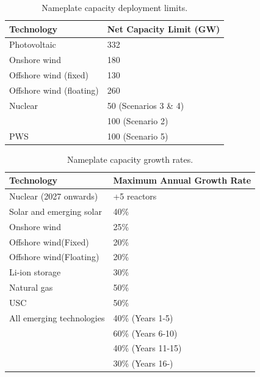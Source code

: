 


\begin{table}[H]
	\caption{Nameplate capacity deployment limits.}
	\vspace{0.1in}
	\begin{tabularx}{\textwidth}{p{} p{} }
		\hline
\textbf{Technology} & \textbf{Net Capacity} \textbf{Limit} (GW)\\
\hline
Photovoltaic \cite{isep_53_2018} & 332 \\
Onshore wind \cite{heger_wind_2016,kato_energy_2016} & 180 \\
Offshore wind (fixed) \cite{heger_wind_2016,kato_energy_2016}& 130 \\
Offshore wind (floating) \cite{heger_wind_2016,kato_energy_2016}& 260 \\
Nuclear & 50 (Scenarios 3 \& 4) \\
 & 100 (Scenario 2) \\
\gls{PWS} \cite{pinaud_technical_2013} & 100 (Scenario 5) \\
\hline 
\end{tabularx}
\label{caplim}
\end{table}

\begin{table}[H]
	\caption{Nameplate capacity growth rates.}
	\vspace{0.1in}
	\begin{tabularx}{\textwidth}{p{} p{}}
		\hline
\textbf{Technology} & \textbf{Maximum Annual Growth Rate} \\
\hline
Nuclear (2027 onwards) & +5 reactors \\
Solar and emerging solar \cite{irena_renewable_2020} & 40\%  \\
Onshore wind \cite{irena_renewable_2020} & 25\% \\
Offshore wind(Fixed) \cite{irena_renewable_2020} & 20\% \\
Offshore wind(Floating) \cite{irena_renewable_2020} & 20\% \\
Li-ion storage & 30\% \\
Natural gas &  50\% \\
\gls{USC} & 50\% \\
All emerging technologies & 40\% (Years 1-5) \\
& 60\% (Years 6-10) \\
 & 40\% (Years 11-15) \\
 & 30\% (Years 16-) \\
\hline 
\end{tabularx}
\label{growrate}
\end{table}

